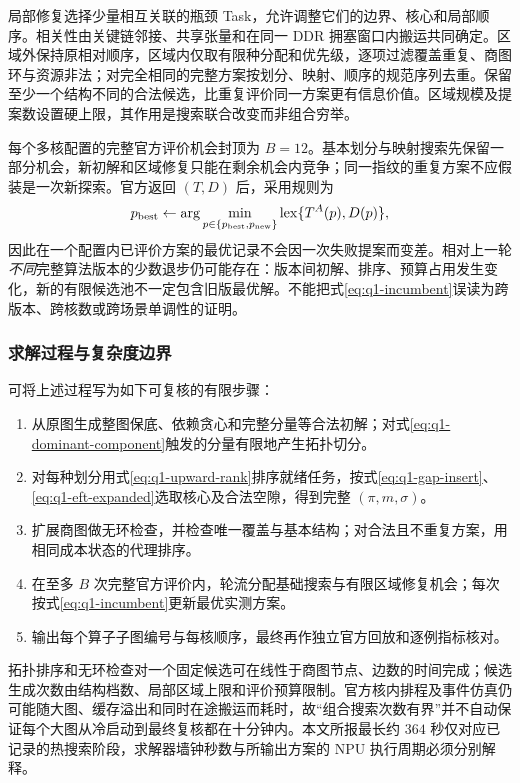 局部修复选择少量相互关联的瓶颈 Task，允许调整它们的边界、核心和局部顺序。相关性由关键链邻接、共享张量和在同一 DDR 拥塞窗口内搬运共同确定。区域外保持原相对顺序，区域内仅取有限种分配和优先级，逐项过滤覆盖重复、商图环与资源非法；对完全相同的完整方案按划分、映射、顺序的规范序列去重。保留至少一个结构不同的合法候选，比重复评价同一方案更有信息价值。区域规模及提案数设置硬上限，其作用是搜索联合改变而非组合穷举。

每个多核配置的完整官方评价机会封顶为 $B=12$。基本划分与映射搜索先保留一部分机会，新初解和区域修复只能在剩余机会内竞争；同一指纹的重复方案不应假装是一次新探索。官方返回 $(T,D)$ 后，采用规则为
\begin{equation}\label{eq:q1-incumbent}
p_{\rm best}\leftarrow
\arg\min_{p\in\{p_{\rm best},p_{\rm new}\}}
\operatorname{lex}\{T^A(p),D(p)\},
\end{equation}
因此在一个配置内已评价方案的最优记录不会因一次失败提案而变差。相对上一轮\emph{不同}完整算法版本的少数退步仍可能存在：版本间初解、排序、预算占用发生变化，新的有限候选池不一定包含旧版最优解。不能把式\eqref{eq:q1-incumbent}误读为跨版本、跨核数或跨场景单调性的证明。

\subsubsection{求解过程与复杂度边界}
可将上述过程写为如下可复核的有限步骤：
\begin{enumerate}[leftmargin=2em]
\item 从原图生成整图保底、依赖贪心和完整分量等合法初解；对式\eqref{eq:q1-dominant-component}触发的分量有限地产生拓扑切分。
\item 对每种划分用式\eqref{eq:q1-upward-rank}排序就绪任务，按式\eqref{eq:q1-gap-insert}、\eqref{eq:q1-eft-expanded}选取核心及合法空隙，得到完整 $(\pi,m,\sigma)$。
\item 扩展商图做无环检查，并检查唯一覆盖与基本结构；对合法且不重复方案，用相同成本状态的代理排序。
\item 在至多 $B$ 次完整官方评价内，轮流分配基础搜索与有限区域修复机会；每次按式\eqref{eq:q1-incumbent}更新最优实测方案。
\item 输出每个算子子图编号与每核顺序，最终再作独立官方回放和逐例指标核对。
\end{enumerate}
拓扑排序和无环检查对一个固定候选可在线性于商图节点、边数的时间完成；候选生成次数由结构档数、局部区域上限和评价预算限制。官方核内排程及事件仿真仍可能随大图、缓存溢出和同时在途搬运而耗时，故“组合搜索次数有界”并不自动保证每个大图从冷启动到最终复核都在十分钟内。本文所报最长约 $364$ 秒仅对应已记录的热搜索阶段，求解器墙钟秒数与所输出方案的 NPU 执行周期必须分别解释。
